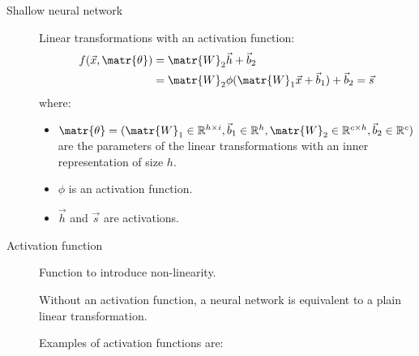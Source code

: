 \begin{description}    
    \item[Shallow neural network] 
        Linear transformations with an activation function:
        \[ 
            \begin{split}
                f(\vec{x}, \matr{\theta}) &= \matr{W}_2 \vec{h} + \vec{b}_2  \\
                &= \matr{W}_2 \phi(\matr{W}_1 \vec{x} + \vec{b}_1) + \vec{b}_2 = \vec{s}
            \end{split}
        \]
        where:
            \begin{itemize}
                \item $\matr{\theta} = (\matr{W}_1 \in \mathbb{R}^{h \times i}, \vec{b}_1 \in \mathbb{R}^{h}, \matr{W}_2 \in \mathbb{R}^{c \times h}, \vec{b}_2 \in \mathbb{R}^{c})$
                    are the parameters of the linear transformations with an inner representation of size $h$.
                \item $\phi$ is an activation function.
                \item $\vec{h}$ and $\vec{s}$ are activations.
            \end{itemize}

    \item[Activation function] 
        Function to introduce non-linearity.

        \begin{remark}
            Without an activation function, a neural network is equivalent to a plain linear transformation.
        \end{remark}

        Examples of activation functions are:
\end{description}
